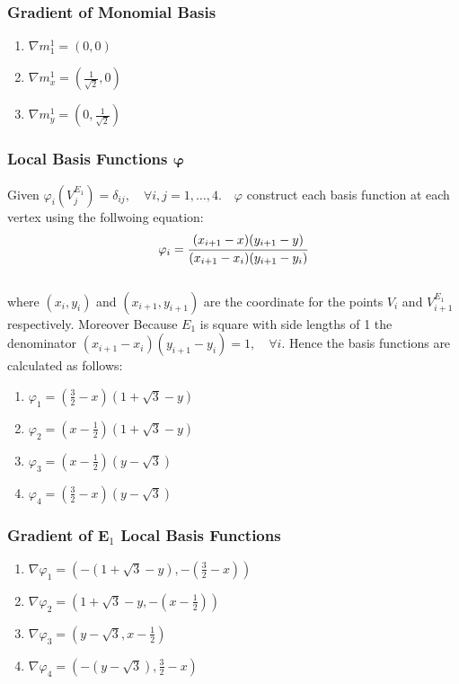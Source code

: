 \documentclass{article}
\begin{document}
\subsubsection{Gradient of Monomial Basis}
\begin{enumerate}
    \item $\nabla m_1^1 = (0,0)$
    \item $\nabla m_x^1 = (\frac{1}{\sqrt{2}},0)$ 
    \item $\nabla m_y^1 = (0,\frac{1}{\sqrt{2}})$ 
\end{enumerate}


\subsubsection{Local Basis Functions $\boldsymbol{\varphi}$}
Given $\varphi_i(V_j^{E_1}) = \delta_{ij}, \quad \forall i,j = 1, \ldots ,4. \quad \varphi$  construct each basis function at each vertex using the follwoing equation:
$$\varphi_i = \cfrac{(x_{i+1}-x)(y_{i+1}-y)}{(x_{i+1}-x_{i})(y_{i+1}-y_{i})}$$\\
where $(x_i, y_i)$ and $(x_{i+1}, y_{i+1})$ are the coordinate for the points $V_i$ and $V_{i+1}^{E_1}$ respectively. Moreover  
Because $E_1$ is square with side lengths of 1 the denominator $(x_{i+1}-x_{i})(y_{i+1}-y_{i}) = 1, \quad \forall i.$ Hence the basis functions are calculated as follows:
\begin{multicols}{2}
    \begin{enumerate}
        \item $\varphi_1 = (\frac{3}{2} - x)(1 + \sqrt{3} - y)$
        \item $\varphi_2 = (x - \frac{1}{2})(1 + \sqrt{3} - y)$
        \item $\varphi_3 = (x - \frac{1}{2} )(y - \sqrt{3})$
        \item $\varphi_4 = (\frac{3}{2} - x)(y - \sqrt{3})$
    \end{enumerate}
\end{multicols}


\subsubsection{Gradient of E$_1$ Local Basis Functions}
\begin{multicols}{2}
    \begin{enumerate}
        \item $\nabla\varphi_1 = \left(-(1 + \sqrt{3} - y),  -(\frac{3}{2}-x)\right)$
        \item $\nabla\varphi_2 = \left(1 + \sqrt{3} - y,-(x - \frac{1}{2})\right)$
        \item $\nabla\varphi_3 = \left(y - \sqrt{3},x - \frac{1}{2}\right)$
        \item $\nabla\varphi_4 = \left(-(y-\sqrt{3}),\frac{3}{2}-x\right)$
    \end{enumerate}
\end{multicols}
\end{document}
